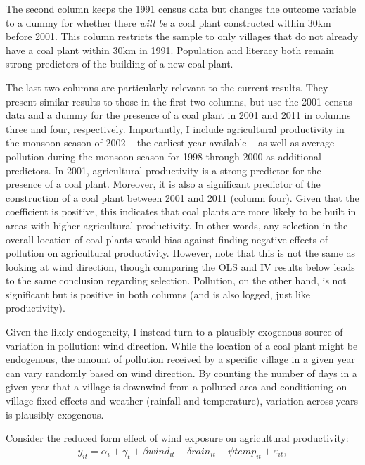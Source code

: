 \documentclass[
]{article}
\begin{document}
The second column keeps the 1991 census data but changes the outcome variable to a dummy for whether there \emph{will be} a coal plant constructed within 30km before 2001. This column restricts the sample to only villages that do not already have a coal plant within 30km in 1991. Population and literacy both remain strong predictors of the building of a new coal plant.

The last two columns are particularly relevant to the current results. They present similar results to those in the first two columns, but use the 2001 census data and a dummy for the presence of a coal plant in 2001 and 2011 in columns three and four, respectively. Importantly, I include agricultural productivity in the monsoon season of 2002 -- the earliest year available -- as well as average pollution during the monsoon season for 1998 through 2000 as additional predictors. In 2001, agricultural productivity is a strong predictor for the presence of a coal plant. Moreover, it is also a significant predictor of the construction of a coal plant between 2001 and 2011 (column four). Given that the coefficient is positive, this indicates that coal plants are more likely to be built in areas with higher agricultural productivity. In other words, any selection in the overall location of coal plants would bias against finding negative effects of pollution on agricultural productivity. However, note that this is not the same as looking at wind direction, though comparing the OLS and IV results below leads to the same conclusion regarding selection. Pollution, on the other hand, is not significant but is positive in both columns (and is also logged, just like productivity).

Given the likely endogeneity, I instead turn to a plausibly exogenous source of variation in pollution: wind direction. While the location of a coal plant might be endogenous, the amount of pollution received by a specific village in a given year can vary randomly based on wind direction. By counting the number of days in a given year that a village is downwind from a polluted area and conditioning on village fixed effects and weather (rainfall and temperature), variation across years is plausibly exogenous.

Consider the reduced form effect of wind exposure on agricultural productivity:
\begin{gather} y_{it} = \alpha_{i} + \gamma_{t} + \beta wind_{it} + \delta rain_{it} + \psi temp_{it} + \varepsilon_{it}, \end{gather}
\end{document}
